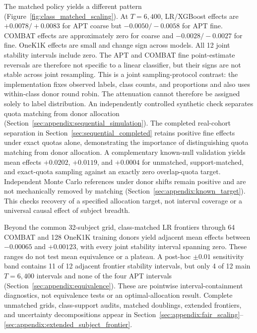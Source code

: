 The matched policy yields a different pattern
(Figure~\ref{fig:class_matched_scaling}). At $T=6{,}400$, LR/XGBoost effects
are $+0.0078/+0.0083$ for APT coarse but $-0.0050/-0.0058$ for APT fine.
COMBAT effects are approximately zero for coarse and $-0.0028/-0.0027$ for
fine. OneK1K effects are small and change sign across models. All 12 joint
stability intervals include zero. The APT and COMBAT fine point-estimate
reversals are therefore not specific to a linear classifier, but their signs
are not stable across joint resampling. This is a
joint sampling-protocol contrast: the implementation fixes observed labels,
class counts, and proportions and also uses within-class donor round robin.
The attenuation cannot therefore be assigned solely to label distribution.
An independently controlled synthetic check separates quota matching from donor
allocation (Section~\ref{sec:appendix:sequential_simulation}). The completed
real-cohort separation in Section~\ref{sec:sequential_completed} retains
positive fine effects under exact quotas alone, demonstrating the importance
of distinguishing quota matching from donor allocation. A complementary known-null
validation yields mean effects $+0.0202$, $+0.0119$, and $+0.0004$ for unmatched,
support-matched, and exact-quota sampling against an exactly zero overlap-quota
target. Independent Monte Carlo references under donor shifts remain positive
and are not mechanically removed by matching
(Section~\ref{sec:appendix:known_target}). This checks recovery of a specified
allocation target, not interval coverage or a universal causal effect of subject breadth.

Beyond the common 32-subject grid, class-matched LR
frontiers through 64 COMBAT and 128 OneK1K training donors yield adjacent
mean effects between $-0.00065$ and $+0.00123$, with every joint stability interval
spanning zero. These ranges do not test mean equivalence or a plateau. A post-hoc
$\pm0.01$ sensitivity band contains 11 of 12 adjacent frontier stability intervals,
but only 4 of 12 main $T=6{,}400$ intervals and none of the four APT intervals
(Section~\ref{sec:appendix:equivalence}). These are pointwise interval-containment
diagnostics, not equivalence tests or an optimal-allocation result. Complete unmatched
grids, class-support audits, matched doublings, extended frontiers, and
uncertainty decompositions appear in
Section~\ref{sec:appendix:fair_scaling}--
\ref{sec:appendix:extended_subject_frontier}.
